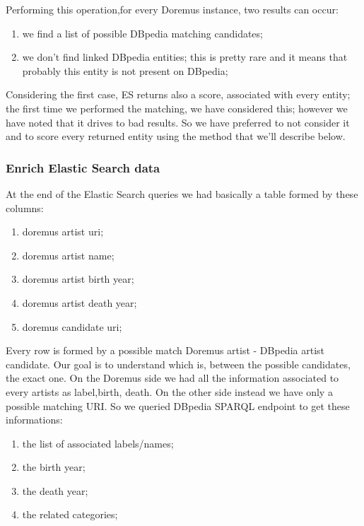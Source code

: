 \documentclass[paper=a4, fontsize=11pt]{scrartcl}
\begin{document}
Performing this operation,for every Doremus instance, two results can occur:

\begin{enumerate}

\item we find a list of possible DBpedia matching candidates;

\item we don't find linked DBpedia entities; this is pretty rare and it means that probably this entity is not present on DBpedia;

\end{enumerate}

Considering the first case, ES returns also a score, associated with every entity; the first time we performed the matching, we have considered this; however we have noted that it drives to bad results. So we have preferred to not consider it and to score every returned entity using the method that we'll describe below.

\subsubsection{Enrich Elastic Search data}

At the end of the Elastic Search queries we had basically a table formed by these columns:

\begin{enumerate}

\item doremus artist uri;

\item doremus artist name;

\item doremus artist birth year;

\item doremus artist death year;

\item doremus candidate uri;

\end{enumerate}

Every row is formed by a possible match Doremus artist - DBpedia artist candidate. 
Our goal is to understand which is, between the possible candidates, the exact one. 
On the Doremus side we had all the information associated to every artists as label,birth, death. On the other side instead we have only a possible matching URI. So we queried DBpedia SPARQL endpoint to get these informations:

\begin{enumerate}

\item the list of associated labels/names;

\item the birth year;

\item the death year;

\item the related categories;

\end{enumerate}
\end{document}
